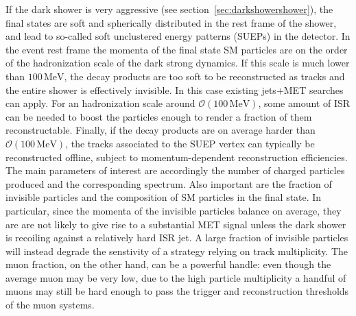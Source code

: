 If the dark shower is very aggressive (see section~\ref{sec:darkshowershower}), the final states are soft and spherically distributed in the rest frame of the shower, and lead to so-called soft unclustered energy patterns (SUEPs) in the detector. In the event rest frame the momenta of the final state SM particles are on the order of the hadronization scale of the dark strong dynamics. If this scale is much lower than $100\,\textrm{MeV}$, the decay products are too soft to be reconstructed as tracks and the entire shower is effectively invisible. In this case existing jets+MET searches can apply. For an hadronization scale around $\mathcal{O}(100\,\textrm{MeV})$, some amount of ISR can be needed to boost the particles enough to render a fraction of them reconstructable. Finally, if the decay products are on average harder than $\mathcal{O}(100\,\textrm{MeV})$, the tracks associated to the SUEP vertex can typically be reconstructed offline, subject to momentum-dependent reconstruction efficiencies. The main parameters of interest are accordingly the number of charged particles produced and the corresponding \pt spectrum. Also important are the fraction of invisible particles and the composition of SM particles in the final state.  In particular, since the momenta of the invisible particles balance on average, they are are not likely to give rise to a substantial MET signal unless the dark shower is recoiling against a relatively hard ISR jet. A large fraction of invisible particles will instead degrade the senstivity of a strategy relying on track multiplicity. The muon fraction, on the other hand, can be a powerful handle: even though the average muon \pt may be very low, due to the high particle multiplicity a handful of muons may still be hard enough to pass the trigger and reconstruction thresholds of the muon systems.

